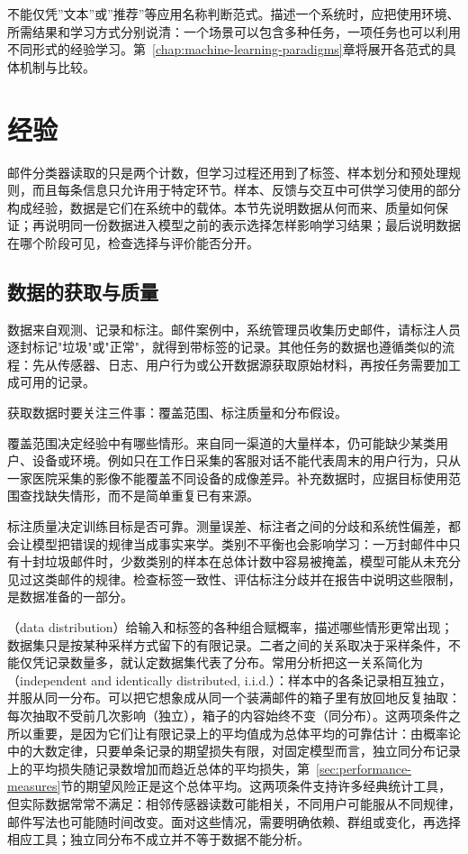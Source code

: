不能仅凭”文本”或”推荐”等应用名称判断范式。描述一个系统时，应把使用环境、所需结果和学习方式分别说清：一个场景可以包含多种任务，一项任务也可以利用不同形式的经验学习。第~\ref{chap:machine-learning-paradigms}章将展开各范式的具体机制与比较。

\section{经验}
\label{sec:machine-learning-data}

邮件分类器读取的只是两个计数，但学习过程还用到了标签、样本划分和预处理规则，而且每条信息只允许用于特定环节。样本、反馈与交互中可供学习使用的部分构成经验，数据是它们在系统中的载体。本节先说明数据从何而来、质量如何保证；再说明同一份数据进入模型之前的表示选择怎样影响学习结果；最后说明数据在哪个阶段可见，检查选择与评价能否分开。

\subsection{数据的获取与质量}
\label{sec:experience-data-distribution}

数据来自观测、记录和标注。邮件案例中，系统管理员收集历史邮件，请标注人员逐封标记"垃圾"或"正常"，就得到带标签的记录。其他任务的数据也遵循类似的流程：先从传感器、日志、用户行为或公开数据源获取原始材料，再按任务需要加工成可用的记录。

获取数据时要关注三件事：覆盖范围、标注质量和分布假设。

覆盖范围决定经验中有哪些情形。来自同一渠道的大量样本，仍可能缺少某类用户、设备或环境。例如只在工作日采集的客服对话不能代表周末的用户行为，只从一家医院采集的影像不能覆盖不同设备的成像差异。补充数据时，应据目标使用范围查找缺失情形，而不是简单重复已有来源。

标注质量决定训练目标是否可靠。测量误差、标注者之间的分歧和系统性偏差，都会让模型把错误的规律当成事实来学。类别不平衡也会影响学习：一万封邮件中只有十封垃圾邮件时，少数类别的样本在总体计数中容易被掩盖，模型可能从未充分见过这类邮件的规律。检查标签一致性、评估标注分歧并在报告中说明这些限制，是数据准备的一部分。

（data distribution）给输入和标签的各种组合赋概率，描述哪些情形更常出现；数据集只是按某种采样方式留下的有限记录。二者之间的关系取决于采样条件，不能仅凭记录数量多，就认定数据集代表了分布。常用分析把这一关系简化为（independent and identically distributed, i.i.d.）：样本中的各条记录相互独立，并服从同一分布。可以把它想象成从同一个装满邮件的箱子里有放回地反复抽取：每次抽取不受前几次影响（独立），箱子的内容始终不变（同分布）。这两项条件之所以重要，是因为它们让有限记录上的平均值成为总体平均的可靠估计：由概率论中的大数定律，只要单条记录的期望损失有限，对固定模型而言，独立同分布记录上的平均损失随记录数增加而趋近总体的平均损失，第~\ref{sec:performance-measures}节的期望风险正是这个总体平均。这两项条件支持许多经典统计工具，但实际数据常常不满足：相邻传感器读数可能相关，不同用户可能服从不同规律，邮件写法也可能随时间改变。面对这些情况，需要明确依赖、群组或变化，再选择相应工具；独立同分布不成立并不等于数据不能分析。

